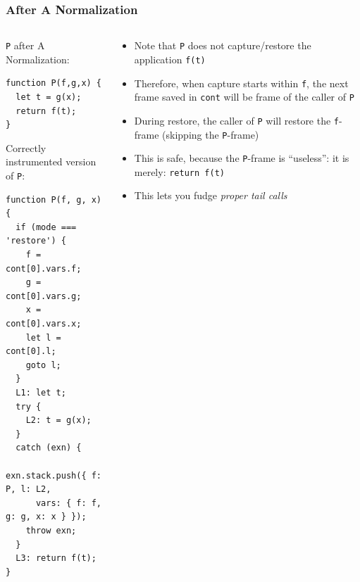 \documentclass[8pt,pdf,handout]{beamer}
\begin{document}
\begin{frame}[fragile]
\frametitle{After A Normalization}
\begin{columns}
\begin{column}{0.49\textwidth}

\lstinline|P| after A Normalization:

\begin{lstlisting}
function P(f,g,x) {
  let t = g(x);
  return f(t);
}
\end{lstlisting}

Correctly instrumented version of \lstinline|P|:

\begin{lstlisting}
function P(f, g, x) {
  if (mode === 'restore') {
    f = cont[0].vars.f;
    g = cont[0].vars.g;
    x = cont[0].vars.x;
    let l = cont[0].l;
    goto l;
  }
  L1: let t;
  try {
    L2: t = g(x);
  }
  catch (exn) {
    exn.stack.push({ f: P, l: L2,
      vars: { f: f, g: g, x: x } });
    throw exn;
  }
  L3: return f(t);
}
\end{lstlisting}
\end{column}

\begin{column}{0.47\textwidth}

\pause

\begin{itemize}

  \item Note that \lstinline|P| does not capture/restore the application
  \lstinline|f(t)|

  \item Therefore, when capture starts within \lstinline|f|, the next
   frame saved in \lstinline|cont| will be frame of the
  caller of \lstinline|P|

  \item During restore, the caller of \lstinline|P| will restore
  the \lstinline|f|-frame (skipping the \lstinline|P|-frame)

  \item This is safe, because the \lstinline|P|-frame is ``useless'':
  it is merely: \lstinline|return f(t)|

  \item This lets you fudge \emph{proper tail calls}

\end{itemize}

\end{column}
\end{columns}

\end{frame}
\end{document}
